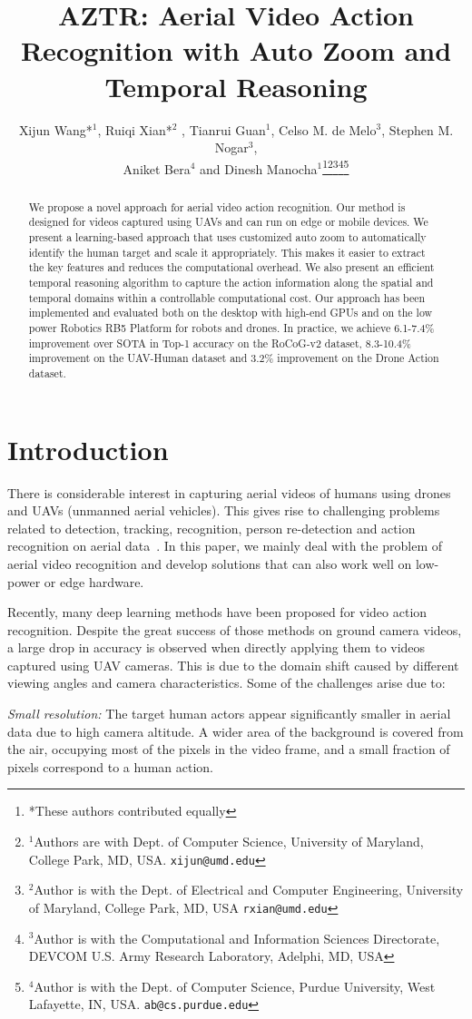 \documentclass[letterpaper, 10 pt, conference]{ieeeconf}
\title{\LARGE \bf
AZTR: Aerial Video Action Recognition with Auto Zoom and Temporal Reasoning
}
\author{Xijun Wang*$^{1}$, Ruiqi Xian*$^{2}$ , Tianrui Guan$^{1}$, Celso M. de Melo$^{3}$, Stephen M. Nogar$^{3}$,\\ Aniket Bera$^{4}$ and Dinesh Manocha$^{1}$\thanks{*These authors contributed equally}\thanks{$^{1}$Authors are with Dept. of Computer Science, University of Maryland, College Park, MD, USA.
        {\tt\small xijun@umd.edu}}\thanks{$^{2}$Author is with the Dept. of Electrical and Computer Engineering, University of Maryland, College Park, MD, USA
        {\tt\small rxian@umd.edu}}\thanks{$^{3}$Author is with the Computational and Information Sciences Directorate, DEVCOM U.S. Army Research Laboratory, Adelphi, MD, USA
        }\thanks{$^{4}$Author is with the Dept. of Computer Science, Purdue University, West Lafayette, IN, USA.
        {\tt\small ab@cs.purdue.edu}}}
\begin{document}
\maketitle
\thispagestyle{empty}
\pagestyle{empty}



\begin{abstract}


We propose a novel approach for aerial video action recognition. Our method is designed for videos captured using UAVs and can run on edge or mobile devices. We present a learning-based approach that uses customized auto zoom to automatically identify the human target and scale it appropriately. This makes it easier to extract the key features and reduces the computational overhead. We also present an efficient temporal reasoning algorithm to capture the action information along the spatial and temporal domains within a controllable computational cost. Our approach has been implemented and evaluated both on the desktop with high-end GPUs and on the low power Robotics RB5 Platform for robots and drones. In practice, we achieve 6.1-7.4\% improvement over SOTA in Top-1 accuracy on the RoCoG-v2 dataset, 8.3-10.4\% improvement on the UAV-Human dataset and 3.2\% improvement on the Drone Action dataset.

\end{abstract}

 \section{Introduction}
\label{sec: introduction}
There is considerable interest in capturing aerial videos of humans using drones and UAVs (unmanned aerial vehicles). This gives rise to challenging problems related to detection, tracking, recognition, person re-detection and action recognition on aerial data~\cite{nguyen2022state}. In this paper, we mainly deal with the problem of aerial video recognition and develop solutions that can also work well on low-power or edge hardware.

Recently, many deep learning methods have been proposed for video action recognition. Despite the great success of those methods on ground camera videos, a large drop in accuracy is observed when directly applying them to videos captured using UAV cameras. This is due to the domain shift caused by different viewing angles and camera characteristics.
Some of the challenges arise due to:


 \textit{Small resolution:} The target human actors  appear significantly smaller in aerial data due to high camera altitude. A wider area of the background is covered from the air, occupying most of the pixels in the video frame, and a small fraction of pixels correspond to a human action.
 
\end{document}
